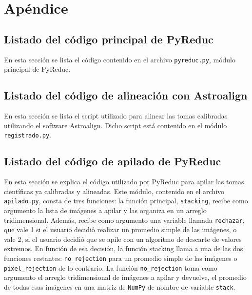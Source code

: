 \documentclass[a4paper, 12pt]{article}
\begin{document}
\newpage
\appendix

\section{Apéndice}
\subsection{Listado del código principal de PyReduc}
En esta sección se lista el código contenido en el archivo {\tt pyreduc.py}, módulo principal de PyReduc.


\subsection{Listado del código de alineación con Astroalign}
En esta sección se lista el script utilizado para alinear las tomas calibradas utilizando el software Astroalign. Dicho script está contenido en el módulo \texttt{registrado.py}.


\subsection{Listado del código de apilado de PyReduc}
\label{sec:apilado}
En esta sección se explica el código utilizado por PyReduc para apilar las tomas científicas ya calibradas y alineadas. Este módulo, contenido en el archivo \texttt{apilado.py}, consta de tres funciones: la función principal, \texttt{stacking}, recibe como argumento la lista de imágenes a apilar y las organiza en un arreglo tridimensional. Además, recibe como argumento una variable llamada {\tt rechazar}, que vale 1 si el usuario decidió realizar un promedio simple de las imágenes, o vale 2, si el usuario decidió que se apile con un algoritmo de descarte de valores extremos. En función de esa decisión, la función stacking llama a una de las dos funciones restantes: {\tt no\_rejection} para un promedio simple de las imágenes o {\tt pixel\_rejection} de lo contrario. La función {\tt no\_rejection} toma como argumento el arreglo tridimensional de imágenes a apilar y devuelve, el promedio de todas esas imágenes en una matriz de \texttt{NumPy} de nombre de variable \texttt{stack}. 
\end{document}
